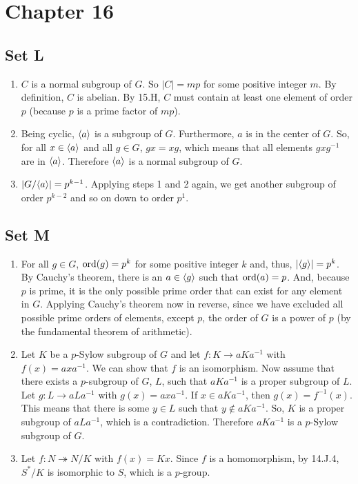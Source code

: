 \section{Chapter 16}
\subsection{Set L}
\begin{enumerate}
    \item $C$ is a normal subgroup of $G$. So $|C| = mp$ for some positive integer $m$. By definition, $C$ is abelian. By 15.H, $C$ must contain at least one element of order $p$ (because $p$ is a prime factor of $mp$).
    \item Being cyclic, $\langle a\rangle$ is a subgroup of $G$. Furthermore, $a$ is in the center of $G$. So, for all $x \in \langle a\rangle$ and all $g \in G$, $gx = xg$, which means that all elements $gxg^{-1}$ are in $\langle a\rangle$.  Therefore $\langle a\rangle$ is a normal subgroup of $G$.
    \item $|G/\langle a\rangle| = p^{k - 1}$. Applying steps 1 and 2 again, we get another subgroup of order $p^{k - 2}$ and so on down to order $p^1$.
\end{enumerate}

\subsection{Set M}
\begin{enumerate}
    \item For all $g \in G$, $\operatorname{ord}(g) = p^k$ for some positive integer $k$ and, thus, $|\langle g\rangle| = p^k$. By Cauchy's theorem, there is an $a \in \langle g\rangle$ such that $\operatorname{ord}(a) = p$. And, because $p$ is prime, it is the only possible prime order that can exist for any element in $G$. Applying Cauchy's theorem now in reverse, since we have excluded all possible prime orders of elements, except $p$, the order of $G$ is a power of $p$ (by the fundamental theorem of arithmetic).
    
    \item Let $K$ be a $p$-Sylow subgroup of $G$ and let $f : K \to aKa^{-1}$ with $f(x) = axa^{-1}$. We can show that $f$ is an isomorphism. Now assume that there exists a $p$-subgroup of $G$, $L$, such that $aKa^{-1}$ is a proper subgroup of $L$. Let $g : L \to aLa^{-1}$ with $g(x) = axa^{-1}$. If $x \in aKa^{-1}$, then $g(x) = f^{-1}(x)$. This means that there is some $y \in L$ such that $y \notin aKa^{-1}$. So, $K$ is a proper subgroup of $aL a^{-1}$, which is a contradiction. Therefore $aKa^{-1}$ is a $p$-Sylow subgroup of $G$.
    \item Let $f : N \twoheadrightarrow N / K$ with $f(x) = Kx$. Since $f$ is a homomorphism, by 14.J.4, $S^* / K$ is isomorphic to $S$, which is a $p$-group.
\end{enumerate}